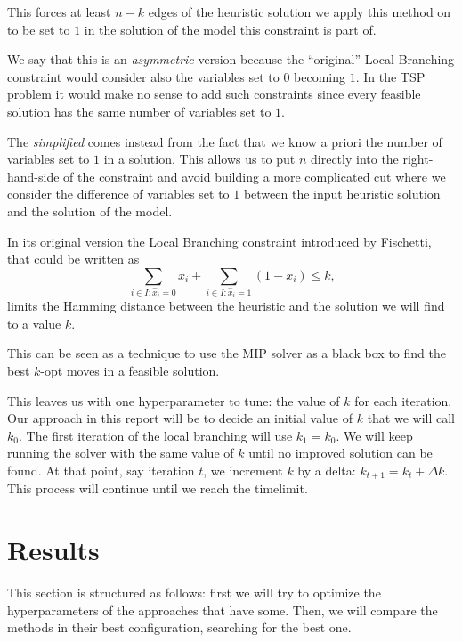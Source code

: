 \documentclass{article}
\begin{document}
This forces at least $n-k$ edges of the heuristic solution we apply this method on to be
set to $1$ in the solution of the model this constraint is part of.

We say that this is an \textit{asymmetric} version because the ``original'' Local Branching
constraint would consider also the variables set to $0$ becoming $1$.
In the TSP problem it would make no sense to add such constraints since every feasible
solution has the same number of variables set to $1$.

The \textit{simplified} comes instead from the fact that we know a priori the number of
variables set to $1$ in a solution. This allows us to put $n$ directly into the right-hand-side
of the constraint and avoid building a more complicated cut where we consider the difference
of variables set to $1$ between the input heuristic solution and the solution of the model.

In its original version the Local Branching constraint introduced by Fischetti, that
could be written as
\begin{equation*}
\sum_{i \in I: \hat{x}_i = 0} x_i + \sum_{i \in I: \hat{x}_i = 1} (1 - x_i) \leq k \text{,}
\end{equation*}
limits the Hamming distance between the heuristic and the solution we will find to
a value $k$.

This can be seen as a technique to use the MIP solver as a black box to find
the best $k$-opt moves in a feasible solution.

This leaves us with one hyperparameter to tune: the value of $k$ for each iteration.
Our approach in this report will be to decide an initial value of $k$ that we will call
$k_{0}$. The first iteration of the local branching will use $k_{1} = k_{0}$.
We will keep running the solver with the same value of $k$ until no improved
solution can be found. At that point, say iteration $t$, we increment $k$ by a delta:
$k_{t+1} = k_{t} + \Delta k$. This process will continue until we reach the timelimit.

\newpage

\section{Results}
\label{sec:results}
This section is structured as follows: first we will try to optimize the hyperparameters
of the approaches that have some. Then, we will compare the methods in their best configuration,
searching for the best one.
\end{document}
